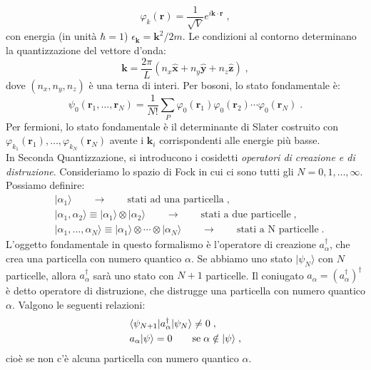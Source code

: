 \documentclass[10pt,a4paper]{report}
\theoremstyle{definition}
\numberwithin{equation}{section}
\newcommand{\bra}{\langle}
\newcommand{\ket}{\rangle}
\begin{document}
\begin{equation}
\varphi_k(\mathbf{r})=\frac{1}{\sqrt{V}}e^{i\mathbf{k}\cdot\mathbf{r}}\;,
\end{equation}
con energia (in unità $\hbar=1$) $\epsilon_{\mathbf{k}}=\mathbf{k}^2/2m$. Le condizioni al contorno determinano la quantizzazione del vettore d'onda:
\begin{equation}
\mathbf{k}=\frac{2\pi}{L}(n_x\hat{\mathbf{x}}+n_y\hat{\mathbf{y}}+n_z\hat{\mathbf{z}})\;,
\end{equation}
dove $(n_x,n_y,n_z)$ è una terna di interi. Per bosoni, lo stato fondamentale è:
\begin{equation}
\psi_0(\mathbf{r}_1,\ldots,\mathbf{r}_N)=\frac{1}{N!}\sum_P\varphi_0(\mathbf{r}_1)\varphi_0(\mathbf{r}_2)\cdots\varphi_0(\mathbf{r}_N)\;.
\end{equation}
Per fermioni, lo stato fondamentale è il determinante di Slater costruito con $\varphi_{k_1}(\mathbf{r}_1),\ldots,\varphi_{k_N}(\mathbf{r}_N)$ avente i $\mathbf{k}_i$ corrispondenti alle energie più basse. \\
In Seconda Quantizzazione, si introducono i cosidetti \emph{operatori di creazione e di distruzione}. Consideriamo lo spazio di Fock in cui ci sono tutti gli $N=0,1,\ldots,\infty$. Possiamo definire:
\begin{align*}
&|\alpha_1\ket\qquad \longrightarrow\qquad \mbox{stati ad una particella}\;, \\
&|\alpha_1,\alpha_2\ket\equiv |\alpha_1\ket\otimes|\alpha_2\ket \qquad \longrightarrow\qquad \mbox{stati a due particelle}\;, \\
&|\alpha_1,\ldots,\alpha_N\ket \equiv |\alpha_1\ket\otimes\cdots\otimes|\alpha_N\ket \qquad \longrightarrow \qquad \mbox{stati a N particelle}\;.
\end{align*}
L'oggetto fondamentale in questo formalismo è l'operatore di creazione $a_{\alpha}^{\dagger}$, che crea una particella con numero quantico $\alpha$. Se abbiamo uno stato $|\psi_N\ket$ con $N$ particelle, allora $a_{\alpha}^{\dagger}$ sarà uno stato con $N+1$ particelle. Il coniugato $a_{\alpha}=(a_{\alpha}^{\dagger})^{\dagger}$ è detto operatore di distruzione, che distrugge una particella con numero quantico $\alpha$. Valgono le seguenti relazioni:
\begin{align}
&\bra\psi_{N+1}|a_{\alpha}^{\dagger}|\psi_N\ket \ne 0 \notag\;, \\
& a_{\alpha}|\psi\ket=0\qquad \mbox{se}\; \alpha\notin |\psi\ket\;,
\end{align}
cioè se non c'è alcuna particella con numero quantico $\alpha$. \\
\end{document}

